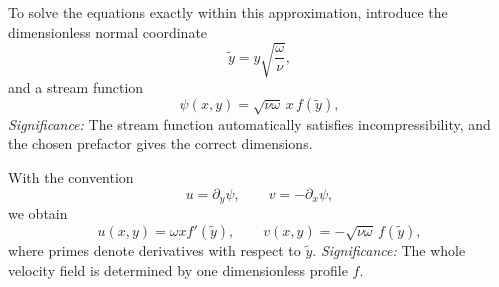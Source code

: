 \documentclass[../main.tex]{subfiles}
\begin{document}
To solve the equations exactly within this approximation, introduce the
dimensionless normal coordinate
\begin{equation}
  \tilde y=y\sqrt{\frac{\omega}{\nu}},
  \label{eq:lec24_dimensionless_y}
\end{equation}
and a stream function
\begin{equation}
  \boxed{\psi(x,y)=\sqrt{\nu\omega}\,x\,f(\tilde y),}
  \label{eq:lec24_stream_function_ansatz}
\end{equation}
\textit{Significance:} The stream function automatically satisfies
incompressibility, and the chosen prefactor gives the correct dimensions.

With the convention
\begin{equation}
  u=\partial_y\psi,\qquad v=-\partial_x\psi,
  \label{eq:lec24_stream_velocity_definition}
\end{equation}
we obtain
\begin{equation}
  \boxed{
  u(x,y)=\omega x f'(\tilde y),\qquad
  v(x,y)=-\sqrt{\nu\omega}\,f(\tilde y),}
  \label{eq:lec24_similarity_velocities}
\end{equation}
where primes denote derivatives with respect to $\tilde y$.
\textit{Significance:} The whole velocity field is determined by one
dimensionless profile $f$.
\end{document}
